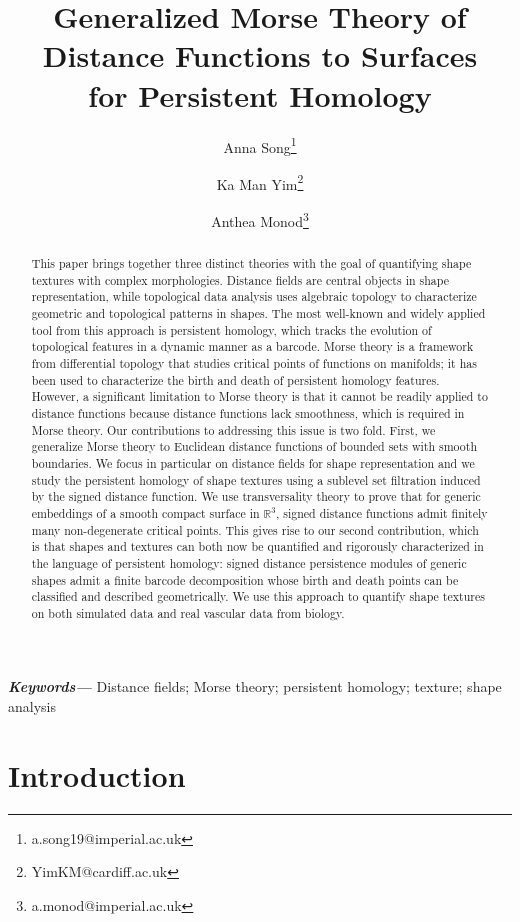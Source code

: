 \documentclass[11pt]{article}
\title{Generalized Morse Theory of Distance Functions to Surfaces\\ for Persistent Homology}
\author[1,2]{Anna Song\thanks{a.song19@imperial.ac.uk}}
\author[3]{Ka Man Yim\thanks{YimKM@cardiff.ac.uk}}
\author[1]{Anthea Monod\thanks{a.monod@imperial.ac.uk}}
\affil[1]{\small Department of Mathematics, Imperial College London, London, UK}
\affil[2]{\small Haematopoietic Stem Cell Laboratory, The Francis Crick Institute, London, UK}
\affil[3]{\small School of Mathematics, Cardiff University, Cardiff, UK}
\newcommand{\R}{\mathbb{R}}
\theoremstyle{plain}
\theoremstyle{definition}
\theoremstyle{remark}
\providecommand{\keywords}[1]{\textbf{\textit{Keywords---}} #1}
\begin{document}
	
	
	\maketitle
	
	\begin{abstract}
		This paper brings together three distinct theories with the goal of quantifying shape textures with complex morphologies. Distance fields are central objects in shape representation, while topological data analysis uses algebraic topology to characterize geometric and topological patterns in shapes. The most well-known and widely applied tool from this approach is persistent homology, which tracks the evolution of topological features in a dynamic manner as a barcode.  Morse theory is a framework from differential topology that studies critical points of functions on manifolds; it has been used to characterize the birth and death of persistent homology features. However, a significant limitation to Morse theory is that it cannot be readily applied to distance functions because distance functions lack smoothness, which is required in Morse theory. Our contributions to addressing this issue is two fold. First, we generalize Morse theory to Euclidean distance functions of bounded sets with smooth boundaries. We focus in particular on distance fields for shape representation and we study the persistent homology of shape textures using a sublevel set filtration induced by the signed distance function. We use transversality theory to prove that for generic embeddings of a smooth compact surface in $\R^3$, signed distance functions admit finitely many non-degenerate critical points.  This gives rise to our second contribution, which is that shapes and textures can both now be quantified and rigorously characterized in the language of persistent homology: signed distance persistence modules of generic shapes admit a finite barcode decomposition whose birth and death points can be classified and described geometrically. We use this approach to quantify shape textures on both simulated data and real vascular data from biology.
	\end{abstract}
	
	\keywords{Distance fields; Morse theory; persistent homology; texture; shape analysis}
	
	\vfill\eject
	
	
	\tableofcontents
	
	
	
	\section{Introduction} \label{sec:intro}
	
\end{document}
